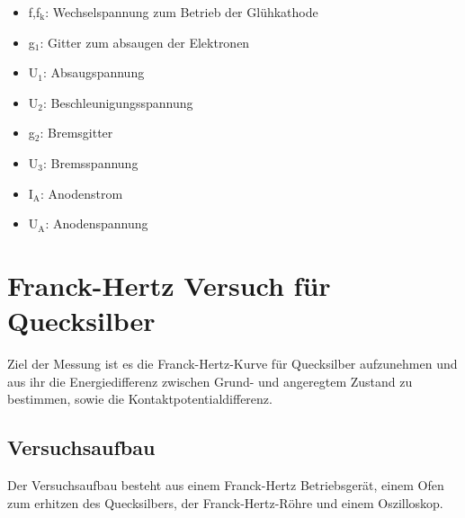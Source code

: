 \documentclass[12pt,a4paper]{article}
\begin{document}
\begin{itemize}
\item	f,f$_\text{k}$:		Wechselspannung	zum Betrieb der Glühkathode

\item	g$_1$:				Gitter zum absaugen der Elektronen

\item	U$_1$:				Absaugspannung

\item	U$_2$:				Beschleunigungsspannung

\item	g$_2$:				Bremsgitter

\item	U$_3$:				Bremsspannung

\item	I$_\text{A}$:		Anodenstrom

\item	U$_\text{A}$:		Anodenspannung
\end{itemize}

\section{Franck-Hertz Versuch für Quecksilber}
Ziel der Messung ist es die Franck-Hertz-Kurve für Quecksilber aufzunehmen und aus ihr die Energiedifferenz zwischen Grund- und angeregtem Zustand zu bestimmen, sowie die Kontaktpotentialdifferenz.

\subsection{Versuchsaufbau}


Der Versuchsaufbau besteht aus einem Franck-Hertz Betriebsgerät, einem Ofen zum erhitzen des Quecksilbers, der Franck-Hertz-Röhre und einem Oszilloskop.
\end{document}
